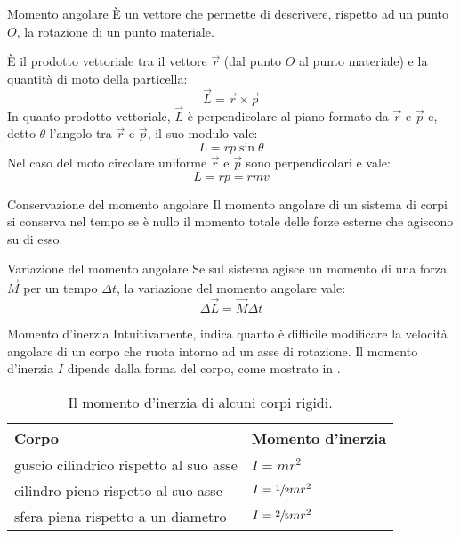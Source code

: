 \documentclass[a4paper,11pt,italian]{article}
\begin{document}
\begin{description}
\begin{soloscientifico} %
  \item[Momento angolare] 
  È un vettore che permette di descrivere, rispetto ad un punto $ O $, la rotazione di un punto materiale.
  
  È il prodotto vettoriale tra il vettore $ \vec{r} $ (dal punto $ O $ al punto materiale) e la quantità di moto della particella:
  \[ \vec{L} = \vec{r} \times \vec{p} \]
  In quanto prodotto vettoriale, $ \vec{L} $ è perpendicolare al piano formato da $ \vec{r} $ e $ \vec{p} $ e, detto $ \theta $ l'angolo tra $ \vec{r} $ e $ \vec{p} $, il suo modulo vale: 
  \[ L = rp\sin\theta \]
  Nel caso del moto circolare uniforme $ \vec{r} $ e $ \vec{p} $ sono perpendicolari e vale:
  \[ L = rp = rmv \]
  
  \item[Conservazione del momento angolare] 
  Il momento angolare di un sistema di corpi si conserva nel tempo se è nullo il momento totale delle forze esterne che agiscono su di esso.
  
  \item[Variazione del momento angolare] 
  Se sul sistema agisce un momento di una forza $ \vec{M} $ per un tempo $ \Delta t $, la variazione del momento angolare vale:
  \[ \Delta \vec{L} = \vec{M}\Delta t \]
  
  \item[Momento d'inerzia] 
  Intuitivamente, indica quanto è difficile modificare la velocità angolare di un corpo che ruota intorno ad un asse di rotazione. 
  Il momento d'inerzia $ I $ dipende dalla forma del corpo, come mostrato in .
  
  \begin{table}[htp]\centering
    \begin{tabular}{ll}\toprule
     \textbf{Corpo} & \textbf{Momento d'inerzia} \\\midrule
     guscio cilindrico rispetto al suo asse & $ I = mr^2 $ \\\addlinespace[.2em]
     cilindro pieno rispetto al suo asse & $ I = \sfrac{1}{2} mr^2 $ \\\addlinespace[.2em]
     sfera piena rispetto a un diametro & $ I = \sfrac{2}{5} mr^2 $ \\\bottomrule
    \end{tabular}
    \caption{Il momento d'inerzia di alcuni corpi rigidi.}
    \label{tab:momentoinerzia}
  \end{table}
  

\end{soloscientifico}
\end{description}
\end{document}
